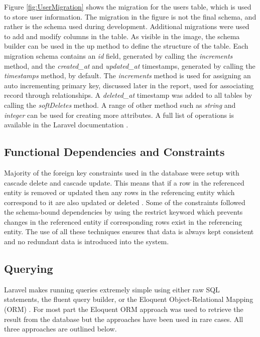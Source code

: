 Figure \ref{fig:UserMigration} shows the migration for the users table, which is used to store user information. The migration in the figure is not the final schema, and rather is the schema used during development. Additional migrations were used to add and modify columns in the table. As visible in the image, the schema builder can be used in the up method to define the structure of the table. Each migration schema contains an \emph{id} field, generated by calling the \emph{increments} method, and the \emph{created\_at} and \emph{updated\_at} timestamps, generated by calling the \emph{timestamps} method, by default. The \emph{increments} method is used for assigning an auto incrementing primary key, discussed later in the report, used for associating record through relationships. A \emph{deleted\_at} timestamp was added to all tables by calling the \emph{softDeletes} method. A range of other method such as \emph{string} and \emph{integer} can be used for creating more attributes. A full list of operations is available in the Laravel documentation \cite{Laravel:Migrations}. 

\subsection{Functional Dependencies and Constraints}
Majority of the foreign key constraints used in the database were setup with cascade delete and cascade update. This means that if a row in the referenced entity is removed or updated then any rows in the referencing entity which correspond to it are also updated or deleted \cite{TechOnTheNet:Cascading}. Some of the constraints followed the schema-bound dependencies by using the restrict keyword which prevents changes in the referenced entity if corresponding rows exist in the referencing entity. The use of all these techniques ensures that data is always kept consistent and no redundant data is introduced into the system.

\subsection{Querying}
Laravel makes running queries extremely simple using either raw SQL statements, the fluent query builder, or the Eloquent Object-Relational Mapping (ORM) \cite{Laravel:Database}. For most part the Eloquent ORM approach was used to retrieve the result from the database but the approaches have been used in rare cases. All three approaches are outlined below.

